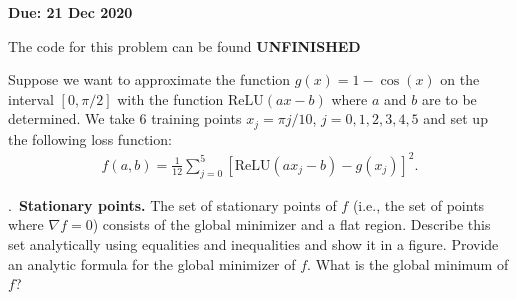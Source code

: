 \documentclass{letter}
\newcounter{problem}
\newcommand{\Problem}[2]{%
	\stepcounter{problem}%
	\leftskip=0pt%
	\theproblem.~\textbf{{#1.}} #2 \par%
}
\newcommand{\Due}[1]{\textbf{Due: #1} \par}
\newcommand{\UNFINISHED}{\textbf{\color{red} UNFINISHED}}
\newcommand{\relu}{\mathrm{ReLU}}
\begin{document}
    \Due{21 Dec 2020}

    The code for this problem can be found \UNFINISHED

    Suppose we want to approximate the function $g(x) = 1 - \cos(x)$ on the interval $[0, \pi/2]$ with the function $\relu(ax - b)$ where $a$ and $b$ are to be determined. We take 6 training points $x_j = \pi j/10$, $j = 0,1,2,3,4,5$ and set up the following loss function: \begin{align*}
        f(a, b) = \frac{1}{12}\sum_{j = 0}^5 [\relu(ax_j - b) - g(x_j)]^2.
    \end{align*}

    \Problem{Stationary points}{The set of stationary points of $f$ (i.e., the set of points where $\nabla f = 0$) consists of the global minimizer and a flat region. Describe this set analytically using equalities and inequalities and show it in a figure. Provide an analytic formula for the global minimizer of $f$. What is the global minimum of $f$?}
\end{document}
